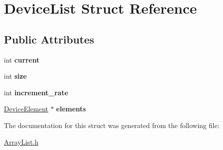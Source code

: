 \hypertarget{structDeviceList}{\section{Device\+List Struct Reference}
\label{structDeviceList}
}
\subsection*{Public Attributes}
\begin{DoxyCompactItemize}
\item 
\hypertarget{structDeviceList_afb4cc685c5661a2599253314968e586c}{int {\bfseries current}}\label{structDeviceList_afb4cc685c5661a2599253314968e586c}

\item 
\hypertarget{structDeviceList_a57607c6a6ab4561a96f30ba96e949a05}{int {\bfseries size}}\label{structDeviceList_a57607c6a6ab4561a96f30ba96e949a05}

\item 
\hypertarget{structDeviceList_af7728914e45b17a9662fa024f015ec1a}{int {\bfseries increment\+\_\+rate}}\label{structDeviceList_af7728914e45b17a9662fa024f015ec1a}

\item 
\hypertarget{structDeviceList_a00c1c31003fe8703e07a9c1600676317}{\hyperlink{structDeviceElement}{Device\+Element} $\ast$ {\bfseries elements}}\label{structDeviceList_a00c1c31003fe8703e07a9c1600676317}

\end{DoxyCompactItemize}


The documentation for this struct was generated from the following file\+:\begin{DoxyCompactItemize}
\item 
\hyperlink{ArrayList_8h}{Array\+List.\+h}\end{DoxyCompactItemize}
